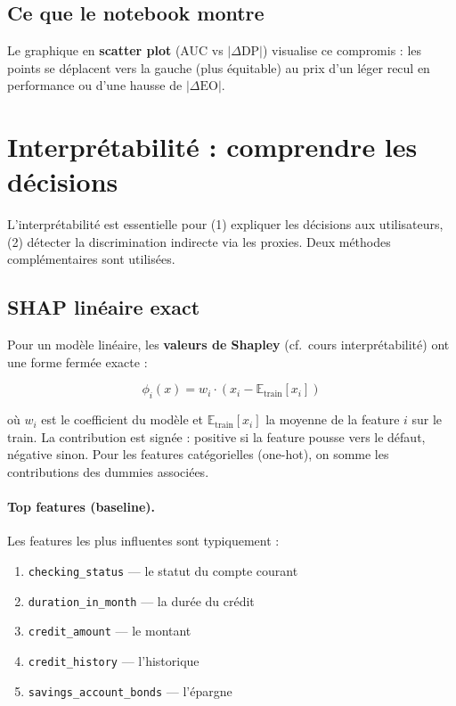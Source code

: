 \documentclass[11pt, a4paper]{article}
\begin{document}
\subsection{Ce que le notebook montre}

Le graphique en \textbf{scatter plot} (AUC vs $|\Delta\text{DP}|$) visualise ce compromis : les points se d\'{e}placent vers la gauche (plus \'{e}quitable) au prix d'un l\'{e}ger recul en performance ou d'une hausse de $|\Delta\text{EO}|$.

\section{Interpr\'{e}tabilit\'{e} : comprendre les d\'{e}cisions}
\label{sec:shap}

\begin{questionbox}
L'interpr\'{e}tabilit\'{e} est essentielle pour (1) expliquer les d\'{e}cisions aux utilisateurs, (2) d\'{e}tecter la discrimination indirecte via les proxies. Deux m\'{e}thodes compl\'{e}mentaires sont utilis\'{e}es.
\end{questionbox}

\subsection{SHAP lin\'{e}aire exact}

Pour un mod\`{e}le lin\'{e}aire, les \textbf{valeurs de Shapley} (cf.~cours interpr\'{e}tabilit\'{e}) ont une forme ferm\'{e}e exacte :

$$\phi_i(x) = w_i \cdot \left(x_i - \mathbb{E}_{\text{train}}[x_i]\right)$$

\noindent o\`{u} $w_i$ est le coefficient du mod\`{e}le et $\mathbb{E}_{\text{train}}[x_i]$ la moyenne de la feature $i$ sur le train. La contribution est sign\'{e}e : positive si la feature pousse vers le d\'{e}faut, n\'{e}gative sinon. Pour les features cat\'{e}gorielles (one-hot), on somme les contributions des dummies associ\'{e}es.

\paragraph{Top features (baseline).} Les features les plus influentes sont typiquement :
\begin{enumerate}
    \item \texttt{checking\_status} --- le statut du compte courant
    \item \texttt{duration\_in\_month} --- la dur\'{e}e du cr\'{e}dit
    \item \texttt{credit\_amount} --- le montant
    \item \texttt{credit\_history} --- l'historique
    \item \texttt{savings\_account\_bonds} --- l'\'{e}pargne
\end{enumerate}
\end{document}
